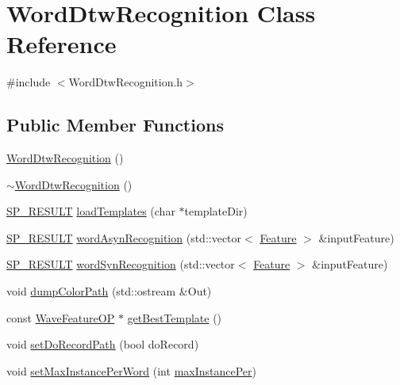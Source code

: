 \hypertarget{class_word_dtw_recognition}{\section{Word\+Dtw\+Recognition Class Reference}
\label{class_word_dtw_recognition}
}


{\ttfamily \#include $<$Word\+Dtw\+Recognition.\+h$>$}

\subsection*{Public Member Functions}
\begin{DoxyCompactItemize}
\item 
\hyperlink{class_word_dtw_recognition_a653a1287b88f956d3ebfa1f82d445671}{Word\+Dtw\+Recognition} ()
\item 
\hyperlink{class_word_dtw_recognition_ac6e182b182ea223871e255f3e102c062}{$\sim$\+Word\+Dtw\+Recognition} ()
\item 
\hyperlink{tool_8h_ab71a1f2fb85a32402ced5c483105b38e}{S\+P\+\_\+\+R\+E\+S\+U\+L\+T} \hyperlink{class_word_dtw_recognition_a152ce48ffd0ff96a8dd67927f073f7cb}{load\+Templates} (char $\ast$template\+Dir)
\item 
\hyperlink{tool_8h_ab71a1f2fb85a32402ced5c483105b38e}{S\+P\+\_\+\+R\+E\+S\+U\+L\+T} \hyperlink{class_word_dtw_recognition_aa62bb713b6017a1dc4784a5d5561ea75}{word\+Asyn\+Recognition} (std\+::vector$<$ \hyperlink{class_feature}{Feature} $>$ \&input\+Feature)
\item 
\hyperlink{tool_8h_ab71a1f2fb85a32402ced5c483105b38e}{S\+P\+\_\+\+R\+E\+S\+U\+L\+T} \hyperlink{class_word_dtw_recognition_ab3f2061dc9d728f7ca887b936881303a}{word\+Syn\+Recognition} (std\+::vector$<$ \hyperlink{class_feature}{Feature} $>$ \&input\+Feature)
\item 
void \hyperlink{class_word_dtw_recognition_ab46172d2b8117cbc5a017b95b669e102}{dump\+Color\+Path} (std\+::ostream \&Out)
\item 
const \hyperlink{class_wave_feature_o_p}{Wave\+Feature\+O\+P} $\ast$ \hyperlink{class_word_dtw_recognition_a0800967c15343c6ad31a255afba9e0dc}{get\+Best\+Template} ()
\item 
void \hyperlink{class_word_dtw_recognition_a08ea68aed658667bbd475cdc5413bd31}{set\+Do\+Record\+Path} (bool do\+Record)
\item 
void \hyperlink{class_word_dtw_recognition_a9ec0c2d2b97b060b0d7dd2a711a59f19}{set\+Max\+Instance\+Per\+Word} (int \hyperlink{pro4__demo__1_8cpp_adc01d2f6980a1af5c3ddc83d847dafa0}{max\+Instance\+Per})
\end{DoxyCompactItemize}
